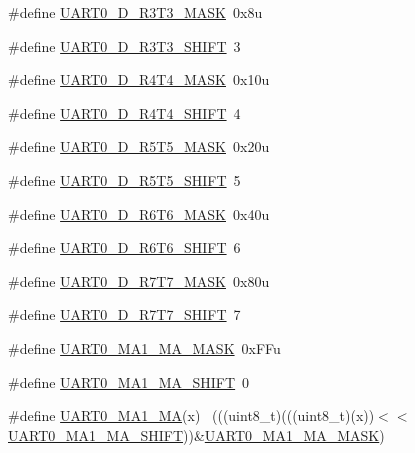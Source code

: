 \begin{DoxyCompactItemize}
\#define \hyperlink{group___u_a_r_t0___register___masks_gadfa2cd1862bf6eb53ee9ac5da895aafe}{U\+A\+R\+T0\+\_\+\+D\+\_\+\+R3\+T3\+\_\+\+M\+A\+SK}~0x8u
\item 
\#define \hyperlink{group___u_a_r_t0___register___masks_ga8b40852e3caf9131f78ca2a2238c5a5d}{U\+A\+R\+T0\+\_\+\+D\+\_\+\+R3\+T3\+\_\+\+S\+H\+I\+FT}~3
\item 
\#define \hyperlink{group___u_a_r_t0___register___masks_ga9ef0e5c43310e85c56accdcac2193bd7}{U\+A\+R\+T0\+\_\+\+D\+\_\+\+R4\+T4\+\_\+\+M\+A\+SK}~0x10u
\item 
\#define \hyperlink{group___u_a_r_t0___register___masks_gae0e84ea8d517404064d82a8fac69e39a}{U\+A\+R\+T0\+\_\+\+D\+\_\+\+R4\+T4\+\_\+\+S\+H\+I\+FT}~4
\item 
\#define \hyperlink{group___u_a_r_t0___register___masks_gaaeccc9a4eea797b215e73defa6eb7fbb}{U\+A\+R\+T0\+\_\+\+D\+\_\+\+R5\+T5\+\_\+\+M\+A\+SK}~0x20u
\item 
\#define \hyperlink{group___u_a_r_t0___register___masks_gad5485d0f250bb194d8c7722f76666178}{U\+A\+R\+T0\+\_\+\+D\+\_\+\+R5\+T5\+\_\+\+S\+H\+I\+FT}~5
\item 
\#define \hyperlink{group___u_a_r_t0___register___masks_gad555e177bcea7c90924e5a98be00380c}{U\+A\+R\+T0\+\_\+\+D\+\_\+\+R6\+T6\+\_\+\+M\+A\+SK}~0x40u
\item 
\#define \hyperlink{group___u_a_r_t0___register___masks_ga1083033a9d6894a5c264dac4f7dc67ce}{U\+A\+R\+T0\+\_\+\+D\+\_\+\+R6\+T6\+\_\+\+S\+H\+I\+FT}~6
\item 
\#define \hyperlink{group___u_a_r_t0___register___masks_gab3a6b86f1cf57c7559bd4200509a354b}{U\+A\+R\+T0\+\_\+\+D\+\_\+\+R7\+T7\+\_\+\+M\+A\+SK}~0x80u
\item 
\#define \hyperlink{group___u_a_r_t0___register___masks_gabe35832ee13e5e5b6ab53ad6f357bac2}{U\+A\+R\+T0\+\_\+\+D\+\_\+\+R7\+T7\+\_\+\+S\+H\+I\+FT}~7
\item 
\#define \hyperlink{group___u_a_r_t0___register___masks_ga9eedde4d09d80e7f305d5217aa6b894f}{U\+A\+R\+T0\+\_\+\+M\+A1\+\_\+\+M\+A\+\_\+\+M\+A\+SK}~0x\+F\+Fu
\item 
\#define \hyperlink{group___u_a_r_t0___register___masks_ga97f0146ebe2278bfbb80f350bcb8f238}{U\+A\+R\+T0\+\_\+\+M\+A1\+\_\+\+M\+A\+\_\+\+S\+H\+I\+FT}~0
\item 
\#define \hyperlink{group___u_a_r_t0___register___masks_ga957c306f9ef6bcd62bf951e3435a22ac}{U\+A\+R\+T0\+\_\+\+M\+A1\+\_\+\+MA}(x)                                                ~(((uint8\+\_\+t)(((uint8\+\_\+t)(x))$<$$<$\hyperlink{group___u_a_r_t0___register___masks_ga97f0146ebe2278bfbb80f350bcb8f238}{U\+A\+R\+T0\+\_\+\+M\+A1\+\_\+\+M\+A\+\_\+\+S\+H\+I\+FT}))\&\hyperlink{group___u_a_r_t0___register___masks_ga9eedde4d09d80e7f305d5217aa6b894f}{U\+A\+R\+T0\+\_\+\+M\+A1\+\_\+\+M\+A\+\_\+\+M\+A\+SK})
$$
\end{DoxyCompactItemize}
